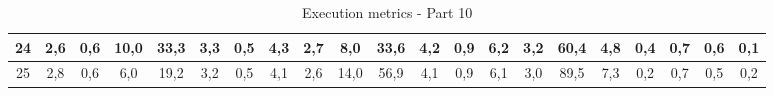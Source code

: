 \begin{sidewaystable}[]
\begin{tabular}{|c|c|c|c|c|c|c|c|c|c|c|c|c|c|c|c|c|c|c|c|c|}
    24 &  2,6                                              & 0,6                                              & 10,0                                             & 33,3                                             & 3,3                                              & 0,5                                              & 4,3                                              & 2,7                                              & 8,0                                              & 33,6                                             & 4,2                                              & 0,9                                              & 6,2                                              & 3,2                                              & 60,4                                             & 4,8                                              & 0,4                                              & 0,7                                              & 0,6                                              & 0,1                                              \\ \hline
    25 &  2,8                                              & 0,6                                              & 6,0                                              & 19,2                                             & 3,2                                              & 0,5                                              & 4,1                                              & 2,6                                              & 14,0                                             & 56,9                                             & 4,1                                              & 0,9                                              & 6,1                                              & 3,0                                              & 89,5                                             & 7,3                                              & 0,2                                              & 0,7                                              & 0,5                                              & 0,2                                              \\ \hline
    \end{tabular}
    \caption{Execution metrics - Part 10}
    \label{tab:ap:exec_metrics_10}
\end{sidewaystable}

